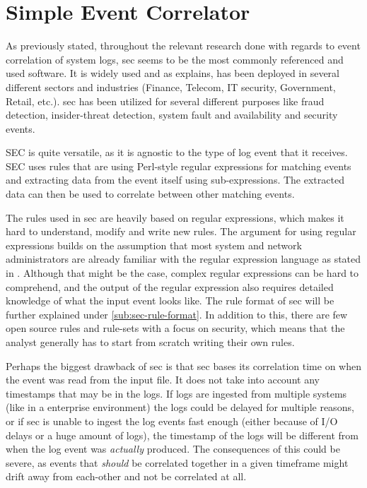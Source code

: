 \section{Simple Event Correlator}
\label{sec:SEC}

As previously stated, throughout the relevant research done with regards to event correlation of system logs, \acrshort{sec} seems to be the most commonly referenced and used software. It is widely used and as \textcite{vaarandi2005tools} explains, has been deployed in several different sectors and industries (Finance, Telecom, IT security, Government, Retail, etc.). \acrshort{sec} has been utilized for several different purposes like fraud detection, insider-threat detection, system fault and availability and security events.

SEC is quite versatile, as it is agnostic to the type of log event that it receives. SEC uses rules that are using Perl-style regular expressions for matching events and extracting data from the event itself using sub-expressions. The extracted data can then be used to correlate between other matching events.

The rules used in \acrshort{sec} are heavily based on regular expressions, which makes it hard to understand, modify and write new rules. The argument for using regular expressions builds on the assumption that most system and network administrators are already familiar with the regular expression language as stated in \textcite{vaarandi2002sec}. Although that might be the case, complex regular expressions can be hard to comprehend, and the output of the regular expression also requires detailed knowledge of what the input event looks like. The rule format of \acrshort{sec} will be further explained under \cref{sub:sec-rule-format}.
In addition to this, there are few open source rules and rule-sets with a focus on security, which means that the analyst generally has to start from scratch writing their own rules.

Perhaps the biggest drawback of \acrshort{sec} is that \acrshort{sec} bases its correlation time on when the event was read from the input file. It does not take into account any timestamps that may be in the logs.
If logs are ingested from multiple systems (like in a enterprise environment) the logs could be delayed for multiple reasons, or if \acrshort{sec} is unable to ingest the log events fast enough (either because of I/O delays or a huge amount of logs), the timestamp of the logs will be different from when the log event was \textit{actually} produced. The consequences of this could be severe, as events that \textit{should} be correlated together in a given timeframe might drift away from each-other and not be correlated at all.

